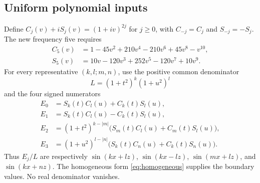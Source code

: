 \subsection{Uniform polynomial inputs}
Define $C_j(v)+iS_j(v)=(1+iv)^{2j}$ for $j\ge0$, with $C_{-j}=C_j$ and $S_{-j}=-S_j$. The new frequency five requires
\begin{align*}
C_5(v)&=1-45v^2+210v^4-210v^6+45v^8-v^{10},\\
S_5(v)&=10v-120v^3+252v^5-120v^7+10v^9.
\end{align*}
For every representative $(k,l;m,n)$, use the positive common denominator
\[
L=(1+t^2)^k(1+u^2)^l
\]
and the four signed numerators
\begin{align*}
E_0&=S_k(t)C_l(u)+C_k(t)S_l(u),\\
E_1&=S_k(t)C_l(u)-C_k(t)S_l(u),\\
E_2&=(1+t^2)^{k-|m|}\bigl(S_m(t)C_l(u)+C_m(t)S_l(u)\bigr),\\
E_3&=(1+u^2)^{l-|n|}\bigl(S_k(t)C_n(u)+C_k(t)S_n(u)\bigr).
\end{align*}
Thus $E_j/L$ are respectively $\sin(kx+lz)$, $\sin(kx-lz)$, $\sin(mx+lz)$, and $\sin(kx+nz)$. The homogeneous form \eqref{eq:homogeneous} supplies the boundary values. No real denominator vanishes.

